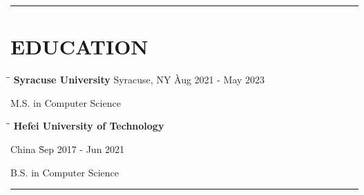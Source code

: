 \documentclass{res}
\begin{document}
 


\address{
    (315)-965-6606 $|$
    \href{mailto:wangtzuhsiang@gmail.com}{wangtzuhsiang@gmail.com} $|$ 
    \href{https://www.linkedin.com/in/zixiangwang/}{LinkedIn} $|$ 
    \href{https://github.com/DolorHunter}{GitHub}
}

\begin{resume}
\vspace{-15pt}
\hspace{-0.55in}
\noindent\rule[0.25\baselineskip]{19.36cm}{1.2pt}    
\vspace{-20pt}  

\vspace{-0.1in}
\section{EDUCATION} 
    \vspace{0.00in}	 
    \begin{tabbing}
    \hspace{3.49in}\= \hspace{2in}\= \kill %
    {\bf Syracuse University} 
        \>Syracuse, NY \` Aug 2021 - May 2023
    \end{tabbing}\vspace{-18.5pt}      %
    M.S. in Computer Science      

    \vspace{-0.15in}	 
    \begin{tabbing}
    \hspace{3.7in}\= \hspace{2in}\= \kill %
    {\bf Hefei University of Technology } 
        
        \>China \` Sep 2017 - Jun 2021
    \end{tabbing}\vspace{-18.5pt}      %
    B.S. in Computer Science   

\vspace{-12pt}
\hspace{-0.55in}
\noindent\rule[0.25\baselineskip]{19.36cm}{0.5pt}    
      

\end{resume}
\end{document}
